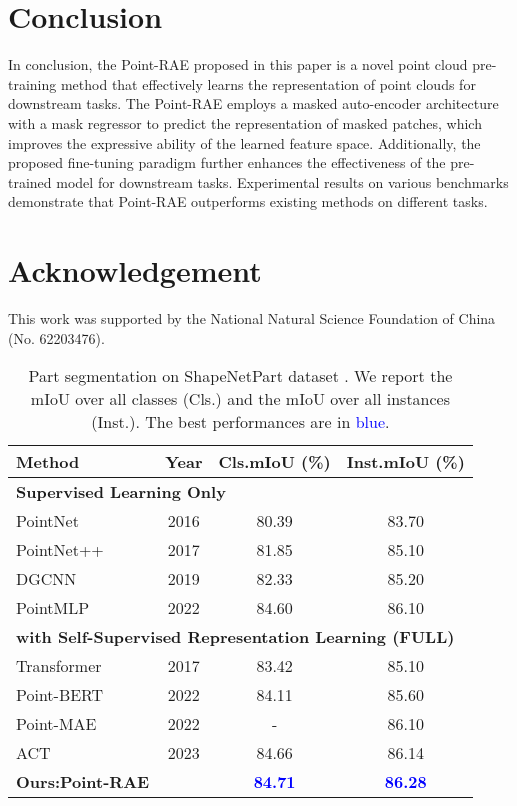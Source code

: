 \documentclass[sigconf, screen]{acmart}
\begin{document}
\section{Conclusion}

In conclusion, the Point-RAE proposed in this paper is a novel point cloud pre-training method that effectively learns the representation of point clouds for downstream tasks. The Point-RAE employs a masked auto-encoder architecture with a mask regressor to predict the representation of masked patches, which improves the expressive ability of the learned feature space. Additionally, the proposed fine-tuning paradigm further enhances the effectiveness of the pre-trained model for downstream tasks. Experimental results on various benchmarks demonstrate that Point-RAE outperforms existing methods on different tasks.

\section{Acknowledgement}
This work was supported by the National Natural Science Foundation of China (No. 62203476).



\normalem   

\balance


\newpage

\appendix

\begin{table}
\caption{
 Part segmentation on ShapeNetPart dataset \cite{yi2016scalable}. 
 We report the mIoU over all classes (Cls.) and the mIoU over all instances (Inst.). The best performances are in \textcolor{blue}{blue}.
}
\centering
\begin{tabular}{@{}lccc}
\toprule[1pt]
Method &Year&  Cls.mIoU (\%)  &  Inst.mIoU (\%)
\\
\midrule[0.5pt]
\multicolumn{4}{l}{
\hspace{-0.5em}\textbf{Supervised Learning Only}}
\\
PointNet \cite{qi2017pointnet} &2016&80.39& 83.70 \\
PointNet++ \cite{qi2017pointnet++} &2017&81.85& 85.10\\
DGCNN \cite{wang2019dynamic} &2019&82.33& 85.20 \\
PointMLP \cite{ma2022rethinking} &2022&84.60 &86.10   \\
\midrule[0.5pt]
\multicolumn{4}{l}{\hspace{-0.5em}\textbf{with Self-Supervised Representation Learning (FULL)}}
\\
Transformer \cite{vaswani2017attention} &2017&83.42&85.10 \\
Point-BERT \cite{yu2022point} &2022&84.11  &85.60  \\
Point-MAE \cite{pang2022masked}&2022 &- &86.10\\
ACT \cite{dong2022autoencoders}&2023 &84.66 &86.14  \\
\textbf{Ours:Point-RAE}  &&\textcolor{blue}{\bf 84.71} &\textcolor{blue}{\bf 86.28} \\
\bottomrule[1pt]

\end{tabular}
\label{part}
\end{table}
\end{document}
